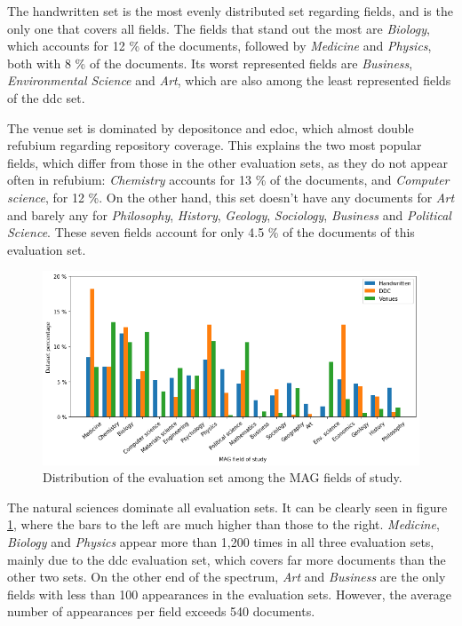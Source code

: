 The handwritten set is the most evenly distributed set regarding fields, and is the only one that covers all fields. The fields that stand out the most are \textit{Biology}, which accounts for 12 \% of the documents, followed by \textit{Medicine} and \textit{Physics}, both with 8 \% of the documents. Its worst represented fields are \textit{Business}, \textit{Environmental Science} and \textit{Art}, which are also among the least represented fields of the \acrshort{ddc} set.

The venue set is dominated by depositonce and edoc, which almost double refubium regarding repository coverage. This explains the two most popular fields, which differ from those in the other evaluation sets, as they do not appear often in refubium: \textit{Chemistry} accounts for 13 \% of the documents, and \textit{Computer science}, for 12 \%. On the other hand, this set doesn't have any documents for \textit{Art} and barely any for \textit{Philosophy}, \textit{History}, \textit{Geology}, \textit{Sociology}, \textit{Business} and \textit{Political Science}. These seven fields account for only 4.5 \% of the documents of this evaluation set.

\begin{figure}
    \centering
    \includegraphics[width=\textwidth]{figures/evaluation/eval_field_distribution.png}
    \caption{Distribution of the evaluation set among the MAG fields of study.}
    \label{fig:eval_field_distribution}
\end{figure}

The natural sciences dominate all evaluation sets. It can be clearly seen in figure \ref{fig:eval_field_distribution}, where the bars to the left are much higher than those to the right. \textit{Medicine}, \textit{Biology} and \textit{Physics} appear more than 1,200 times in all three evaluation sets, mainly due to the \acrshort{ddc} evaluation set, which covers far more documents than the other two sets. On the other end of the spectrum, \textit{Art} and \textit{Business} are the only fields with less than 100 appearances in the evaluation sets. However, the average number of appearances per field exceeds 540 documents.